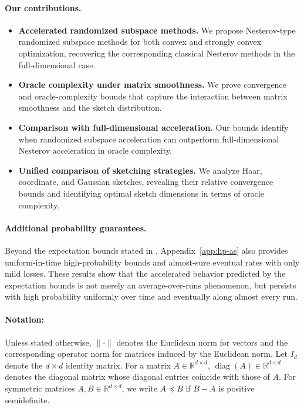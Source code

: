 \documentclass[10pt]{article}
\newcommand{\diag}{\operatorname{diag}}
\begin{document}
\paragraph{Our contributions.}
\begin{itemize}
\item \textbf{Accelerated randomized subspace methods.}
  We propose Nesterov-type randomized subspace methods for both convex and strongly convex optimization,
  recovering the corresponding classical Nesterov methods in the full-dimensional case.

\item \textbf{Oracle complexity under matrix smoothness.}
  We prove convergence and oracle-complexity bounds that capture the interaction between
  matrix smoothness and the sketch distribution.

\item \textbf{Comparison with full-dimensional acceleration.}
  Our bounds identify when randomized subspace acceleration can outperform full-dimensional
  Nesterov acceleration in oracle complexity.


\item \textbf{Unified comparison of sketching strategies.}
  We analyze Haar, coordinate, and Gaussian sketches, revealing their relative convergence bounds
  and identifying optimal sketch dimensions in terms of oracle complexity.
\end{itemize}


\paragraph{Additional probability guarantees.}
Beyond the expectation bounds stated in , Appendix~\ref{app:hp-as}
also provides uniform-in-time high-probability bounds and almost-sure eventual
rates with only mild losses.
These results show that the accelerated behavior predicted by the expectation
bounds is not merely an average-over-runs phenomenon, but persists with high
probability uniformly over time and eventually along almost every run.

\paragraph{Notation: }
\label{sec:notation}
Unless stated otherwise, $\|\cdot\|$ denotes the Euclidean norm for vectors
  and the corresponding operator norm for matrices induced by the Euclidean norm. Let $I_d$ denote the 
$d \times d$ identity matrix.
For a matrix \(A\in\mathbb{R}^{d\times d}\), \(\diag(A)\in\mathbb{R}^{d\times d}\) denotes the diagonal matrix whose diagonal entries coincide with those of \(A\).
For symmetric matrices \(A,B\in\mathbb{R}^{d\times d}\), we write
\(A\preceq B\) if \(B-A\) is positive semidefinite.
\end{document}
